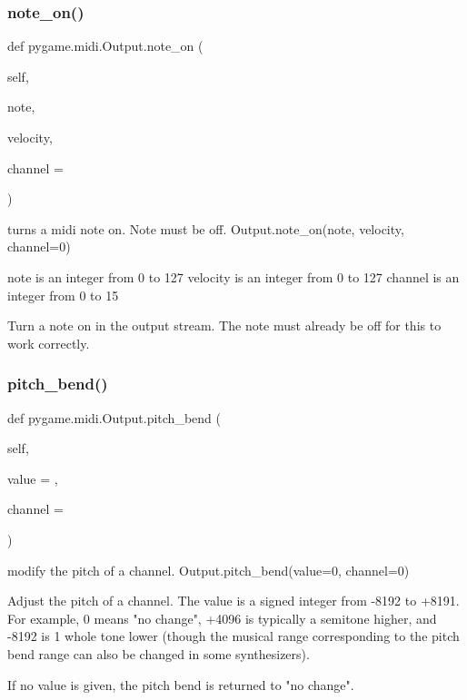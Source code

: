 \subsubsection{\texorpdfstring{note\+\_\+on()}{note\_on()}}
{\footnotesize\ttfamily def pygame.\+midi.\+Output.\+note\+\_\+on (\begin{DoxyParamCaption}\item[{}]{self,  }\item[{}]{note,  }\item[{}]{velocity,  }\item[{}]{channel = {} }\end{DoxyParamCaption})}

\begin{DoxyVerb}turns a midi note on.  Note must be off.
Output.note_on(note, velocity, channel=0)

note is an integer from 0 to 127
velocity is an integer from 0 to 127
channel is an integer from 0 to 15

Turn a note on in the output stream.  The note must already
be off for this to work correctly.
\end{DoxyVerb}
 \mbox{\label{classpygame_1_1midi_1_1_output_a5768f014f295925d28da962355a45a55}} 
\subsubsection{\texorpdfstring{pitch\+\_\+bend()}{pitch\_bend()}}
{\footnotesize\ttfamily def pygame.\+midi.\+Output.\+pitch\+\_\+bend (\begin{DoxyParamCaption}\item[{}]{self,  }\item[{}]{value = {},  }\item[{}]{channel = {} }\end{DoxyParamCaption})}

\begin{DoxyVerb}modify the pitch of a channel.
Output.pitch_bend(value=0, channel=0)

Adjust the pitch of a channel.  The value is a signed integer
from -8192 to +8191.  For example, 0 means "no change", +4096 is
typically a semitone higher, and -8192 is 1 whole tone lower (though
the musical range corresponding to the pitch bend range can also be
changed in some synthesizers).

If no value is given, the pitch bend is returned to "no change".
\end{DoxyVerb}
 \mbox{\label{classpygame_1_1midi_1_1_output_a0e520ff021805297d99fbdf2857f8bbb}} 
